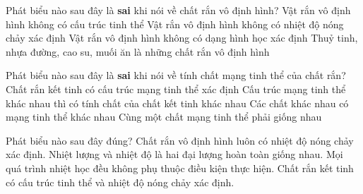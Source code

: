 \begin{ex}
	{\color{red}\footnotesize\ttfamily [L12C1B1-TN-3]}\par %
	Phát biểu nào sau đây là \textbf{sai} khi nói về chất rắn vô định hình?
	\choice
	{Vật rắn vô định hình không có cấu trúc tinh thể}
	{Vật rắn vô định hình không có nhiệt độ nóng chảy xác định}
	{Vật rắn vô định hình không có dạng hình học xác định}
	{\True Thuỷ tinh, nhựa đường, cao su, muối ăn là những chất rắn vô định hình}
\end{ex}

\begin{ex}
	{\color{red}\footnotesize\ttfamily [L12C1B1-TN-16]}\par %
	Phát biểu nào sau đây là \textbf{sai} khi nói về tính chất mạng tinh thể của chất rắn?
	\choice
	{Chất rắn kết tinh có cấu trúc mạng tinh thể xác định}
	{Cấu trúc mạng tinh thể khác nhau thì có tính chất của chất kết tinh khác nhau}
	{Các chất khác nhau có mạng tinh thể khác nhau}
	{\True Cùng một chất mạng tinh thể phải giống nhau} %
\end{ex}

\begin{ex}
 Phát biểu nào sau đây đúng?
\choice
{Chất rắn vô định hình luôn có nhiệt độ nóng chảy xác định.}
{Nhiệt lượng và nhiệt độ là hai đại lượng hoàn toàn giống nhau.}
{Mọi quá trình nhiệt học đều không phụ thuộc điều kiện thực hiện.}
{\True Chất rắn kết tinh có cấu trúc tinh thể và nhiệt độ nóng chảy xác định.}
\end{ex}
